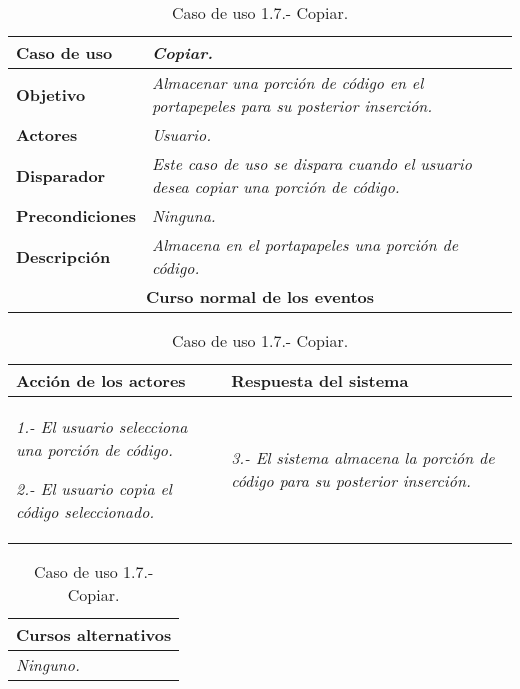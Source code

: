 \documentclass[twoside,a4paper,11pt]{book}
\begin{document}
\begin{table}[!ht]
    \centering
    \begin{tabular}{|p{4cm}|p{11.5cm}|}
    \hline

    \textbf{Caso de uso} & \textit{Copiar.}\\
    \hline

    \textbf{Objetivo} & \textit{Almacenar una porción de código en el portapepeles para su posterior inserción.}\\
    \hline

    \textbf{Actores} & \textit{Usuario.}\\
    \hline

    \textbf{Disparador} & \textit{Este caso de uso se dispara cuando el usuario desea copiar una porción de código.}\\
    \hline

    \textbf{Precondiciones} & \textit{Ninguna.}\\
    \hline

    \textbf{Descripción} & \textit{Almacena en el portapapeles una porción de código.}\\
    \hline

    \multicolumn{2}{|c|}{\textbf{Curso normal de los eventos}}\\
    \hline

    \end{tabular}
    \begin{tabular}{|p{7.75cm}|p{7.75cm}|}
    \hspace{2cm}\textbf{Acción de los actores} & \hspace{1.75cm}\textbf{Respuesta del sistema}\\
    \hline

    \textit{1.- El usuario selecciona una porción de código.}

    \textit{2.- El usuario copia el código seleccionado.}
    &
    \textit{3.- El sistema almacena la porción de código para su posterior inserción.}
    \\
    \hline
    \end{tabular}

    \begin{tabular}{|p{15.9cm}|}
      \hspace{6cm}\textbf{Cursos alternativos}\\
      \hline     
	\textit{Ninguno.}
      \\
      \hline
    \end{tabular}
    \caption{Caso de uso 1.7.- Copiar.}
\end{table}
\end{document}
